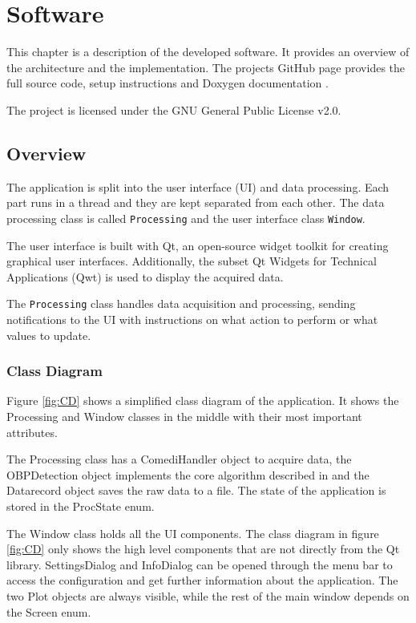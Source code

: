\chapter{Software}\label{cp:sw}

This chapter is a description of the developed software. It provides an overview of the architecture and the implementation. The projects GitHub page provides the full source code, setup instructions and Doxygen documentation \citep{Belinda2020}. %

The project is licensed under the GNU General Public License v2.0.

\section{Overview}
The application is split into the user interface (UI) and data processing. Each part runs in a thread and they are kept separated from each other. The data processing class is called \texttt{Processing} and the user interface class \texttt{Window}. 

The user interface is built with Qt, an open-source widget toolkit for creating graphical user interfaces. Additionally, the subset Qt Widgets for Technical Applications (Qwt) is used to display the acquired data.

The \texttt{Processing} class handles data acquisition and processing, sending notifications to the UI with instructions on what action to perform or what values to update.

\subsection{Class Diagram}
Figure \ref{fig:CD} shows a simplified class diagram of the application. It shows the Processing and Window classes in the middle with their most important attributes. 

The Processing class has a ComediHandler object to acquire data, the OBPDetection object implements the core algorithm described in  and the Datarecord object saves the raw data to a file. The state of the application is stored in the ProcState enum.

The Window class holds all the UI components. The class diagram in figure \ref{fig:CD} only shows the high level components that are not directly from the Qt library. SettingsDialog and InfoDialog can be opened through the menu bar to access the configuration and get further information about the application. The two Plot objects are always visible, while the rest of the main window depends on the Screen enum.

